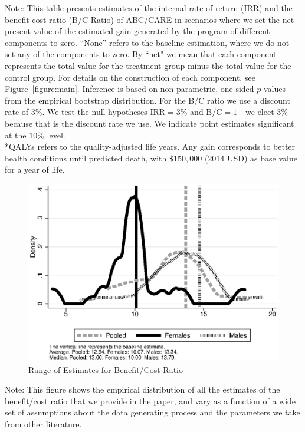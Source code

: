 \documentclass[static]{JJH-Beamer}
\begin{document}
{\flushleft \tiny Note: This table presents estimates of the internal rate of return (IRR) and the benefit-cost ratio (B/C Ratio) of ABC/CARE in scenarios where we set the net-present value of the estimated gain generated by the program of different components to zero. ``None'' refers to the baseline estimation, where we do not set any of the components to zero. By ``net" we mean that each component represents the total value for the treatment group minus the total value for the control group. For details on the construction of each component, see Figure~\ref{figure:main}. Inference is based on non-parametric, one-sided $p$-values from the empirical bootstrap distribution. For the B/C ratio we use a discount rate of $3\%$. We test the null hypotheses $\text{IRR} = 3\%$ and $\text{B/C} = 1$---we elect $3\%$ because that is the discount rate we use. We indicate point estimates significant at the $10\%$ level. \\
*QALYs refers to the quality-adjusted life years. Any gain corresponds to better health conditions until predicted death, with $\$150,000$ (2014 USD) as base value for a year of life.\\}


\begin{figure}[H]
\caption{Range of Estimates for Benefit/Cost Ratio}
\begin{center}
\includegraphics[width=.7\columnwidth]{output/overalldist_IRR.eps}
\end{center}
\end{figure}
{\flushleft \scriptsize Note: This figure shows the empirical distribution of all the estimates of the benefit/cost ratio that we provide in the paper, and vary as a function of a wide set of assumptions about the data generating process and the parameters we take from other literature.\\}
\end{document}
